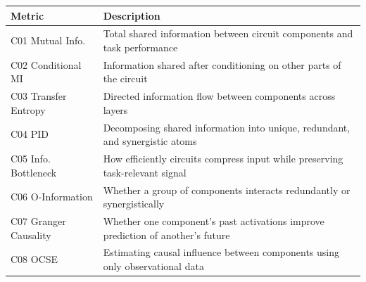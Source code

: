 \documentclass{article}
\begin{document}
\begin{minipage}{\linewidth}
\par
\begin{center}

\begin{tabular}{@{}lp{10cm}@{}}
\toprule
\textbf{Metric} & \textbf{Description} \\
\midrule
C01 Mutual Info. & Total shared information between circuit components and task performance \\
\midrule
C02 Conditional MI & Information shared after conditioning on other parts of the circuit \\
\midrule
C03 Transfer Entropy & Directed information flow between components across layers \\
\midrule
C04 PID & Decomposing shared information into unique, redundant, and synergistic atoms \\
\midrule
C05 Info. Bottleneck & How efficiently circuits compress input while preserving task-relevant signal \\
\midrule
C06 O-Information & Whether a group of components interacts redundantly or synergistically \\
\midrule
C07 Granger Causality & Whether one component's past activations improve prediction of another's future \\
\midrule
C08 OCSE & Estimating causal influence between components using only observational data \\
\bottomrule
\end{tabular}
\end{center}
\end{minipage}
\end{document}
